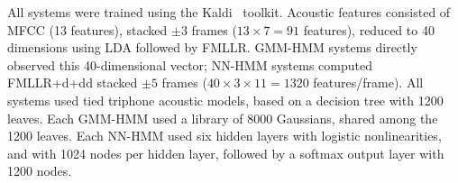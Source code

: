All systems were trained using the Kaldi~\cite{Kaldi2011}
toolkit. {\color{blue} Acoustic features consisted of MFCC (13
  features), stacked $\pm 3$ frames ($13\times 7=91$ features),
  reduced to 40 dimensions using LDA followed by FMLLR.  GMM-HMM
  systems directly observed this 40-dimensional vector; NN-HMM systems
  computed FMLLR+d+dd stacked $\pm 5$ frames ($40\times 3\times
  11=1320$ features/frame).  All systems used tied triphone acoustic
  models, based on a decision tree with 1200 leaves.  Each GMM-HMM
  used a library of 8000 Gaussians, shared among the 1200 leaves.
  Each NN-HMM used six hidden layers with logistic nonlinearities, and
  with 1024 nodes per hidden layer, followed by a softmax output layer
  with 1200 nodes.}
  







